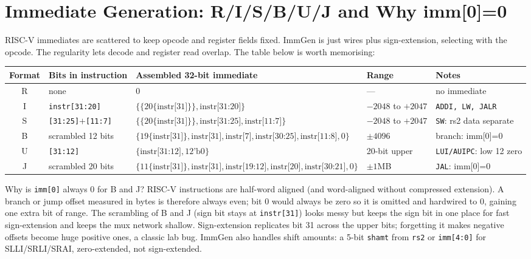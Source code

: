 \section{Immediate Generation: R/I/S/B/U/J and Why imm[0]=0}
RISC-V immediates are scattered to keep opcode and register fields fixed. ImmGen is just wires plus sign-extension, selecting with the opcode. The regularity lets decode and register read overlap. The table below is worth memorising:
\begin{center}
\scriptsize
\begin{tabular}{@{}cllll@{}}
\toprule Format & Bits in instruction & Assembled 32-bit immediate & Range & Notes\\ \midrule
R & none & $0$ & --- & no immediate\\
I & \texttt{instr[31:20]} & $\{\{20\{\text{instr[31]}\}\},\text{instr[31:20]}\}$ & $-2048$ to $+2047$ & \texttt{ADDI, LW, JALR}\\
S & \texttt{[31:25]}$+$\texttt{[11:7]} & $\{\{20\{\text{instr[31]}\}\},\text{instr[31:25]},\text{instr[11:7]}\}$ & $-2048$ to $+2047$ & \texttt{SW}: rs2 data separate\\
B & scrambled 12 bits & $\{19\{\text{instr[31]}\},\text{instr[31]},\text{instr[7]},\text{instr[30:25]},\text{instr[11:8]},0\}$ & $\pm4096$ & branch: imm[0]=0\\
U & \texttt{[31:12]} & $\{\text{instr[31:12]},12\text{'b0}\}$ & 20-bit upper & \texttt{LUI/AUIPC}: low 12 zero\\
J & scrambled 20 bits & $\{11\{\text{instr[31]}\},\text{instr[31]},\text{instr[19:12]},\text{instr[20]},\text{instr[30:21]},0\}$ & $\pm1$MB & \texttt{JAL}: imm[0]=0\\ \bottomrule
\end{tabular}
\end{center}
Why is \texttt{imm[0]} always 0 for B and J? RISC-V instructions are half-word aligned (and word-aligned without compressed extension). A branch or jump offset measured in bytes is therefore always even; bit 0 would always be zero so it is omitted and hardwired to 0, gaining one extra bit of range. The scrambling of B and J (sign bit stays at \texttt{instr[31]}) looks messy but keeps the sign bit in one place for fast sign-extension and keeps the mux network shallow. Sign-extension replicates bit 31 across the upper bits; forgetting it makes negative offsets become huge positive ones, a classic lab bug. ImmGen also handles shift amounts: a 5-bit \texttt{shamt} from \texttt{rs2} or \texttt{imm[4:0]} for SLLI/SRLI/SRAI, zero-extended, not sign-extended.

